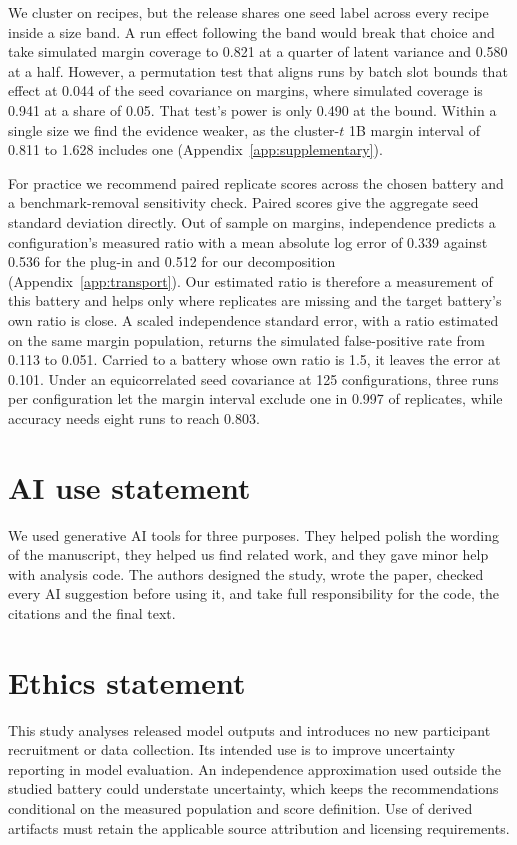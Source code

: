 \documentclass{article}
\begin{document}
We cluster on recipes, but the release shares one seed label across every recipe inside a size band. A run effect following the band would break that choice and take simulated margin coverage to 0.821 at a quarter of latent variance and 0.580 at a half. However, a permutation test that aligns runs by batch slot bounds that effect at 0.044 of the seed covariance on margins, where simulated coverage is 0.941 at a share of 0.05. That test's power is only 0.490 at the bound. Within a single size we find the evidence weaker, as the cluster-$t$ 1B margin interval of 0.811 to 1.628 includes one (Appendix~\ref{app:supplementary}).

For practice we recommend paired replicate scores across the chosen battery and a benchmark-removal sensitivity check. Paired scores give the aggregate seed standard deviation directly. Out of sample on margins, independence predicts a configuration's measured ratio with a mean absolute log error of 0.339 against 0.536 for the plug-in and 0.512 for our decomposition (Appendix~\ref{app:transport}). Our estimated ratio is therefore a measurement of this battery and helps only where replicates are missing and the target battery's own ratio is close. A scaled independence standard error, with a ratio estimated on the same margin population, returns the simulated false-positive rate from 0.113 to 0.051. Carried to a battery whose own ratio is 1.5, it leaves the error at 0.101. Under an equicorrelated seed covariance at 125 configurations, three runs per configuration let the margin interval exclude one in 0.997 of replicates, while accuracy needs eight runs to reach 0.803.

\label{maintext:end}
\section*{AI use statement}
We used generative AI tools for three purposes. They helped polish the wording of the manuscript, they helped us find related work, and they gave minor help with analysis code. The authors designed the study, wrote the paper, checked every AI suggestion before using it, and take full responsibility for the code, the citations and the final text.

\section*{Ethics statement}
This study analyses released model outputs and introduces no new participant recruitment or data collection. Its intended use is to improve uncertainty reporting in model evaluation. An independence approximation used outside the studied battery could understate uncertainty, which keeps the recommendations conditional on the measured population and score definition. Use of derived artifacts must retain the applicable source attribution and licensing requirements.
\end{document}
